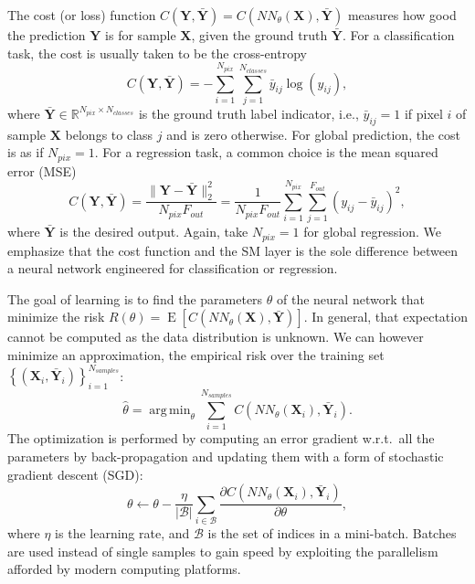 \documentclass[final,twocolumn,3p,times,authoryear]{elsarticle}
\renewcommand{\b}[1]{{\bm{#1}}}   %
\newcommand{\1}{\b{1}}              %
\newcommand{\0}{\b{0}}              %
\newcommand{\B}{\mathcal{B}}
\newcommand{\X}{\b{X}}
\newcommand{\Y}{\b{Y}}
\newcommand{\R}{\mathbb{R}}
\DeclareMathOperator*{\esp}{E}
\DeclareMathOperator*{\argmin}{arg \, min}
\begin{document}
The cost (or loss) function $C(\Y, \bar \Y) = C(NN_\theta(\X), \bar \Y)$ measures how good the prediction $\Y$ is for sample $\X$, given the ground truth $\bar \Y$. For a classification task, the cost is usually taken to be the cross-entropy
\begin{equation*}
	C(\Y, \bar \Y) = - \sum_{i=1}^{N_{pix}} \sum_{j=1}^{N_{classes}} \bar y_{ij} \log(y_{ij}),
\end{equation*}
where $\bar \Y \in \R^{N_{pix} \times N_{classes}}$ is the ground truth label indicator, i.e., $\bar y_{ij} = 1$ if pixel $i$ of sample $\X$ belongs to class $j$ and is zero otherwise. For global prediction, the cost is as if $N_{pix} = 1$.
For a regression task, a common choice is the mean squared error (MSE)
\begin{equation*}
	C(\Y, \bar \Y) = \frac{\|\Y-\bar{\Y}\|_2^2}{N_{pix} F_{out}} = \frac{1}{N_{pix} F_{out}} \sum_{i=1}^{N_{pix}} \sum_{j=1}^{F_{out}} (y_{ij} - \bar y_{ij})^2,
\end{equation*}
where $\bar{\Y}$ is the desired output. Again, take $N_{pix} = 1$ for global regression. We emphasize that the cost function and the SM layer is the sole difference between a neural network engineered for classification or regression.

The goal of learning is to find the parameters $\theta$ of the neural network that minimize the risk $R(\theta) = \esp \left[ C \left( NN_\theta(\X), \bar \Y \right) \right]$. In general, that expectation cannot be computed as the data distribution is unknown. We can however minimize an approximation, the empirical risk over the training set $\left\{ \left( \X_i, \bar \Y_i \right) \right\}_{i=1}^{N_{samples}}$:
\begin{equation*}
	\hat{\theta} = \argmin_\theta \sum_{i=1}^{N_{samples}} C \left(NN_\theta(\X_i), \bar \Y_i \right).
\end{equation*}
The optimization is performed by computing an error gradient w.r.t.\ all the parameters by back-propagation and updating them with a form of stochastic gradient descent (SGD):
\begin{equation*}
	\theta \leftarrow \theta - \frac{\eta}{|\B|} \sum_{i \in \B} \frac{\partial C \left( NN_\theta(\X_i), \bar \Y_i \right)}{\partial \theta} ,
\end{equation*}
where $\eta$ is the learning rate, and $\B$ is the set of indices in a mini-batch. Batches are used instead of single samples to gain speed by exploiting the parallelism afforded by modern computing platforms.
\end{document}
